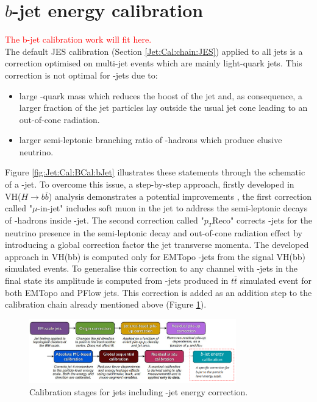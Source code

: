 \section{$b$-jet energy calibration}
\label{Jet:Cal:BCal}
\textcolor{red}{The b-jet calibration work will fit here. \\}
The default JES calibration (Section \ref{Jet:Cal:chain:JES}) applied to all jets is a correction optimised on multi-jet events which are mainly light-quark jets. This correction is not optimal for \bq-jets due to:
\begin{itemize}
    \item large \bq-quark mass which reduces the boost of the jet and, as consequence, a larger fraction of the jet particles lay outside the usual jet cone leading to an out-of-cone radiation.
    \item larger semi-leptonic branching ratio of \bq-hadrons which produce elusive neutrino.
\end{itemize}
Figure \ref{fig:Jet:Cal:BCal:bJet} illustrates these statements through the schematic of a \bq-jet. To overcome this issue, a step-by-step approach, firstly developed in VH($H\rightarrow b\bar{b}$) analysis demonstrates a potential improvements \cite{Vhbb}, the first correction called "$\mu$-in-jet" includes soft muon in the jet to address the semi-leptonic decays of \bq-hadrons inside \bq-jet. The second correction called "$p_T$Reco" corrects \bq-jets for the neutrino presence in the semi-leptonic decay and out-of-cone radiation effect by introducing a global correction factor the jet transverse momenta. The developed approach in VH(bb) is computed only for EMTopo \bq-jets from the signal VH(bb) simulated events. To generalise this correction to any channel with \bq-jets in the final state its amplitude is computed from \bq-jets produced in $t\bar{t}$ simulated event for both EMTopo and PFlow jets. This correction is added as an addition step to the calibration chain already mentioned above (Figure \ref{fig:Jet:Cal:BCal:Chain}).
\begin{figure}[ht]
    \centering
    \includegraphics[width=0.8\textwidth]{Ch4/Img/b_jet_chain.png}
    \caption{Calibration stages for jets including \bq-jet energy correction.}
    \label{fig:Jet:Cal:BCal:Chain}
\end{figure}

